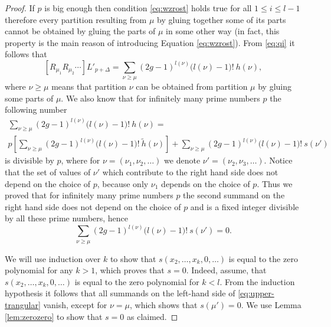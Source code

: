 \documentclass[12pt]{amsart}
\theoremstyle{plain}
\theoremstyle{remark}
\newcommand{\Sym}{\mathfrak{S}}
\begin{document}
\begin{proof}
If $p$ is big enough then condition
\eqref{eq:wzrost} holds true for all $1\leq i \leq l-1$ therefore every
partition resulting from $\mu$ by gluing together some of its parts cannot be
obtained by gluing the parts of $\mu$ in some other way (in fact, this
property is the main reason of introducing Equation \eqref{eq:wzrost}). 
From \eqref{eq:qi} it follows that
$$[R_{\mu_1} R_{\mu_2} \cdots] L'_{p+\Delta} = 
\sum_{\nu\geq\mu}(2g-1)^{l(\nu)}\big(l(\nu)-1\big)!\ h(\nu),$$
where $\nu\geq\mu$ means that partition $\nu$ can be obtained from partition
$\mu$ by gluing some parts of $\mu$.
We also know that for infinitely many prime numbers $p$ the following number
\begin{multline*}
\sum_{\nu\geq\mu}(2g-1)^{l(\nu)}\big(l(\nu)-1\big)!\ h(\nu) = \\
p\left[ \sum_{\nu\geq\mu}(2g-1)^{l(\nu)}\big(l(\nu)-1\big)!\
\tilde{h}(\nu)\right] 
+ \sum_{\nu\geq\mu}(2g-1)^{l(\nu)}\big(l(\nu)-1\big)!\ s(\nu')
\end{multline*}
is divisible by $p$, where for $\nu
= (\nu_1,\nu_2,\dots)$ we denote $\nu' = (\nu_2,\nu_3,\dots)$. Notice that the
set of values of $\nu'$ which contribute to the right
hand side does not depend on the choice of $p$, because only $\nu_1$ depends on
the choice of $p$.
Thus we proved that for infinitely many prime numbers $p$ the second
summand on the
right hand side does not depend on the choice of $p$ and 
is a fixed integer divisible
by all these prime numbers, hence 
\begin{equation}
\label{eq:upper-trangular}
 \sum_{\nu\geq\mu}(2g-1)^{l(\nu)}\big(l(\nu)-1\big)!\ s(\nu') = 0.  
\end{equation}

We will use induction over $k$ to show that $s(x_2,\dots,x_k,0,\dots)$ is equal
to the zero polynomial for any $k > 1$, which proves that $s=0$. Indeed, assume,
that
$s(x_2,\dots,x_k,0,\dots)$ is equal
to the zero polynomial for $k < l$. From
the induction hypothesis it follows that all summands
on the left-hand side of \eqref{eq:upper-trangular} vanish, except for
$\nu=\mu$, which shows that $s(\mu')=0$. We use Lemma
\ref{lem:zerozero} to show that $s=0$ as claimed.
\end{proof}
\end{document}
